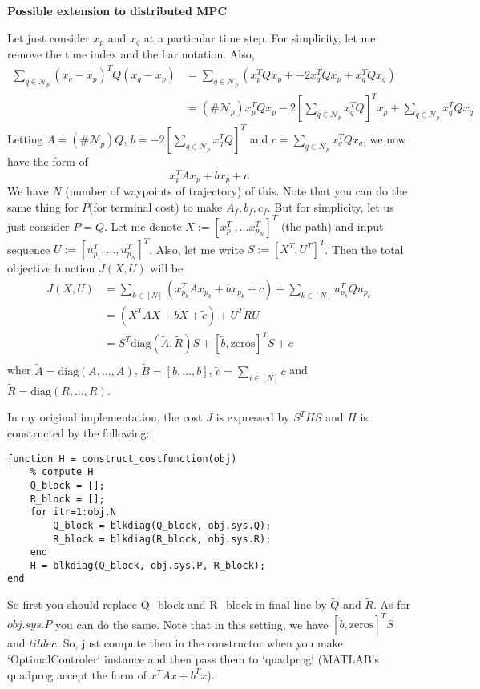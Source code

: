 \documentclass[15pt]{article}
\newcommand{\np}{\mathcal{N}_p}
\begin{document}
\begin{center}
  \textbf{Possible extension to distributed MPC} 
\end{center}

Let just consider $x_p$ and $x_q$ at a particular time step. For simplicity, let me remove the time index and the bar notation. Also, 
\begin{align}
  \sum_{q\in \np}(x_q -x_p)^T Q (x_q - x_p) &= \sum_{q \in \np} \left( x_p^T Q x_p + - 2 x_q^T Q x_p + x_q^T Q x_q  \right) \\
   & = (\#\np) x_p^T Q x_p - 2 \left[ \sum_{q\in \np} x_q^T Q \right] ^T x_p + \sum_{q\in \np} x_q^T Q x_q
\end{align}
Letting $A = (\#\np) Q$, $b = -2\left[ \sum_{q\in \np} x_q^T Q \right] ^T$ and $c = \sum_{q\in \np} x_q^T Q x_q$, we now have the form of 
\[
  x_p^TAx_p + b x_p + c
\]
We have $N$ (number of waypoints of trajectory) of this. Note that you can do the same thing for $P$(for terminal cost) to make $A_f, b_f, c_f$. But for simplicity, let us just consider $P=Q$. Let me denote $X:=[x_{p_1}^T, \ldots x_{p_N}^T]^T$ (the path) and input sequence $U:=[u_{p_1}^T, \ldots, u_{p_N}^T]^T$. Also, let me write $S:=[X^T, U^T]^T$. Then the total objective function $J(X, U)$ will be 
\begin{align}
  J(X, U) &= \sum_{k\in [N]} \left( x_{p_k}^T A x_{p_k} + b x_{p_k} + c \right) + \sum_{k\in[N]} u_{p_k}^TQu_{p_{k}} \\
  &= \left( X^T \tilde{A} X + \tilde{b} X + \tilde{c} \right)  + U^T \tilde{R} U \\
  &= S^T \mathrm{diag}(\tilde{A}, \tilde{R}) S + [\tilde{b}, \mathrm{zeros}]^T S + \tilde{c}\\
\end{align} 
wher $\tilde{A} = \mathrm{diag}(A, \ldots, A)$, $\tilde{B} = [b, \ldots, b]$, $\tilde{c}=\sum_{i\in [N]}^{} c$ and $\tilde{R} = \mathrm{diag}(R, \ldots, R)$. 

In my original implementation, the cost $J$ is expressed by $S^T H S$ and $H$ is constructed by the following:
\begin{lstlisting}
function H = construct_costfunction(obj)
    % compute H
    Q_block = [];
    R_block = [];
    for itr=1:obj.N
        Q_block = blkdiag(Q_block, obj.sys.Q);
        R_block = blkdiag(R_block, obj.sys.R);
    end
    H = blkdiag(Q_block, obj.sys.P, R_block);
end
\end{lstlisting}
So first you should replace Q\_block and R\_block in final line by $\tilde{Q}$ and $\tilde{R}$. As for $obj.sys.P$ you can do the same. Note that in this setting, we have $[\tilde{b}, \mathrm{zeros}]^TS$ and $tilde{c}$. So, just compute then in the constructor when you make `OptimalControler` instance and then pass them to `quadprog` (MATLAB's quadprog accept the form of $x^T A x + b^Tx$).
\end{document}
